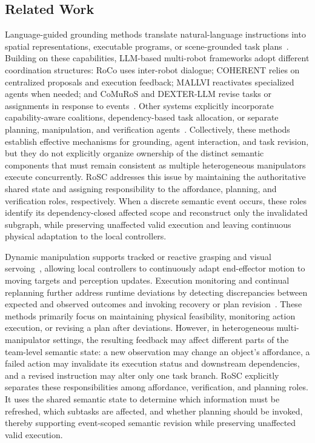 \subsection{Related Work}
\label{sec:related_work}
\providecommand{\finalchange}[1]{#1}
\providecommand{\localexecchange}[1]{#1}

Language-guided grounding methods translate natural-language instructions into
spatial representations, executable programs, or scene-grounded task
plans~\cite{huang2023inner,liang2023code,rana2023sayplan,
huang2023voxposer}. Building on these capabilities, LLM-based multi-robot
frameworks adopt different coordination structures: RoCo uses inter-robot
dialogue; COHERENT relies on centralized proposals and execution feedback;
MALLVI reactivates specialized agents when needed; and CoMuRoS and DEXTER-LLM
revise tasks or assignments in response to events~\cite{
mandi2024roco,liu2025coherent,taji2026mallvi,
borate2026comuros,zhu2025dexter}. Other systems explicitly incorporate
capability-aware coalitions, dependency-based task allocation, or separate
planning, manipulation, and verification agents~\cite{
kannan2024smartllm,obata2025lipllm,he2026closedloop}. Collectively, these
methods establish effective mechanisms for grounding, agent interaction, and
task revision, but they do not explicitly organize ownership of the distinct
semantic components that must remain consistent as multiple heterogeneous
manipulators execute concurrently. RoSC addresses this issue by maintaining
the authoritative shared state and assigning responsibility
to the affordance, planning, and verification
roles, respectively. When a discrete semantic event occurs, these roles
identify its dependency-closed affected scope and reconstruct only the
invalidated subgraph, while preserving unaffected valid execution and leaving
continuous physical adaptation to the local controllers.


Dynamic manipulation supports tracked or reactive grasping and visual
servoing~\cite{marturi2019dynamic,maranci2026reactive,liu2023target,
haviland2020finalphase}, allowing local controllers to continuously adapt
end-effector motion to moving targets and perception updates. Execution
monitoring and continual replanning further address runtime deviations by
detecting discrepancies between expected and observed outcomes and invoking
recovery or plan revision~\cite{pettersson2005execution,brenner2009continual,
levihn2013foresight}. These methods primarily focus on
maintaining physical feasibility, monitoring action execution, or revising a
plan after deviations. However, in heterogeneous multi-manipulator settings,
the resulting feedback may affect different parts of the team-level semantic
state: a new observation may change an object's affordance, a failed action may
invalidate its execution status and downstream dependencies, and a revised
instruction may alter only one task branch. RoSC explicitly separates these
responsibilities among affordance, verification, and planning roles. It uses
the shared semantic state to determine which information must be refreshed,
which subtasks are affected, and whether planning should be invoked, thereby
supporting event-scoped semantic revision while preserving unaffected valid
execution.
